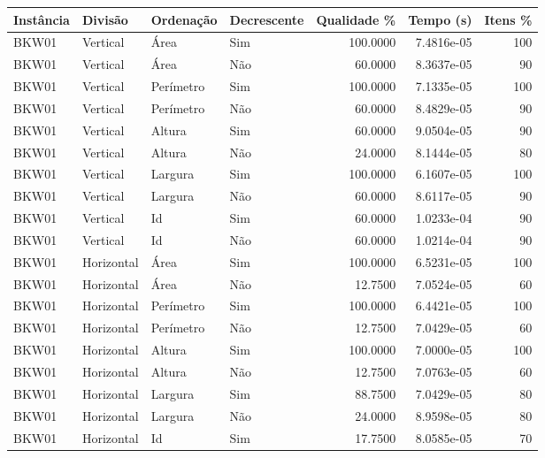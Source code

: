 \begin{tabular}{llllrrr}
\hline
Instância & Divisão     & Ordenação & Decrescente & Qualidade \% & Tempo (s)  & Itens \% \\
\hline
BKW01     & Vertical    & Área      & Sim         & 100.0000     & 7.4816e-05 & 100      \\
BKW01     & Vertical    & Área      & Não         & 60.0000      & 8.3637e-05 & 90       \\
BKW01     & Vertical    & Perímetro & Sim         & 100.0000     & 7.1335e-05 & 100      \\
BKW01     & Vertical    & Perímetro & Não         & 60.0000      & 8.4829e-05 & 90       \\
BKW01     & Vertical    & Altura    & Sim         & 60.0000      & 9.0504e-05 & 90       \\
BKW01     & Vertical    & Altura    & Não         & 24.0000      & 8.1444e-05 & 80       \\
BKW01     & Vertical    & Largura   & Sim         & 100.0000     & 6.1607e-05 & 100      \\
BKW01     & Vertical    & Largura   & Não         & 60.0000      & 8.6117e-05 & 90       \\
BKW01     & Vertical    & Id        & Sim         & 60.0000      & 1.0233e-04 & 90       \\
BKW01     & Vertical    & Id        & Não         & 60.0000      & 1.0214e-04 & 90       \\
BKW01     & Horizontal  & Área      & Sim         & 100.0000     & 6.5231e-05 & 100      \\
BKW01     & Horizontal  & Área      & Não         & 12.7500      & 7.0524e-05 & 60       \\
BKW01     & Horizontal  & Perímetro & Sim         & 100.0000     & 6.4421e-05 & 100      \\
BKW01     & Horizontal  & Perímetro & Não         & 12.7500      & 7.0429e-05 & 60       \\
BKW01     & Horizontal  & Altura    & Sim         & 100.0000     & 7.0000e-05 & 100      \\
BKW01     & Horizontal  & Altura    & Não         & 12.7500      & 7.0763e-05 & 60       \\
BKW01     & Horizontal  & Largura   & Sim         & 88.7500      & 7.0429e-05 & 80       \\
BKW01     & Horizontal  & Largura   & Não         & 24.0000      & 8.9598e-05 & 80       \\
BKW01     & Horizontal  & Id        & Sim         & 17.7500      & 8.0585e-05 & 70       \\

\end{tabular}

